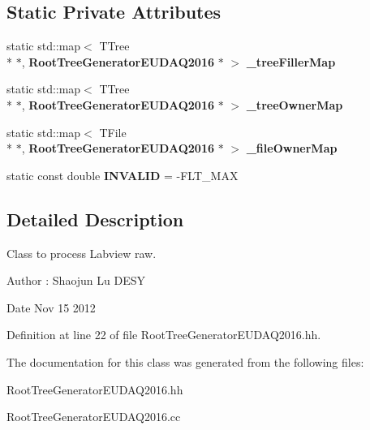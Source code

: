 \subsection*{Static Private Attributes}
\begin{DoxyCompactItemize}
\item 
static std\-::map$<$ T\-Tree \\*
$\ast$, {\bf Root\-Tree\-Generator\-E\-U\-D\-A\-Q2016} $\ast$ $>$ {\bfseries \-\_\-tree\-Filler\-Map}\label{classCALICE_1_1RootTreeGeneratorEUDAQ2016_a903416643c6674afccaea80284251609}

\item 
static std\-::map$<$ T\-Tree \\*
$\ast$, {\bf Root\-Tree\-Generator\-E\-U\-D\-A\-Q2016} $\ast$ $>$ {\bfseries \-\_\-tree\-Owner\-Map}\label{classCALICE_1_1RootTreeGeneratorEUDAQ2016_a3308044bfa6b2926022e7b2d5c332535}

\item 
static std\-::map$<$ T\-File \\*
$\ast$, {\bf Root\-Tree\-Generator\-E\-U\-D\-A\-Q2016} $\ast$ $>$ {\bfseries \-\_\-file\-Owner\-Map}\label{classCALICE_1_1RootTreeGeneratorEUDAQ2016_a15406fbbea39ab6fbca1f5feacfd2bfd}

\item 
static const double {\bfseries I\-N\-V\-A\-L\-I\-D} = -\/F\-L\-T\-\_\-\-M\-A\-X\label{classCALICE_1_1RootTreeGeneratorEUDAQ2016_ab2522fe7595699b48a20555da4923c39}

\end{DoxyCompactItemize}


\subsection{Detailed Description}
Class to process Labview raw. 

\begin{DoxyAuthor}{Author}
\-: Shaojun Lu D\-E\-S\-Y 
\end{DoxyAuthor}
\begin{DoxyDate}{Date}
Nov 15 2012 
\end{DoxyDate}


Definition at line 22 of file Root\-Tree\-Generator\-E\-U\-D\-A\-Q2016.\-hh.



The documentation for this class was generated from the following files\-:\begin{DoxyCompactItemize}
\item 
Root\-Tree\-Generator\-E\-U\-D\-A\-Q2016.\-hh\item 
Root\-Tree\-Generator\-E\-U\-D\-A\-Q2016.\-cc\end{DoxyCompactItemize}
